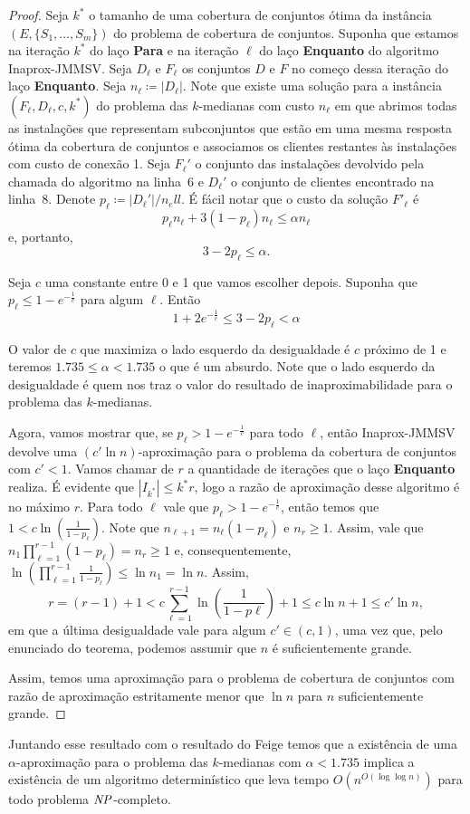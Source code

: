 \begin{proof}
Seja $k^*$ o tamanho de uma cobertura de conjuntos ótima da instância $(E,\{S_1,\ldots,S_m\})$ do problema de cobertura de conjuntos. Suponha que estamos na iteração $k^*$ do laço {\bf Para} e na iteração $\ell$ do laço {\bf Enquanto} do algoritmo {\sc Inaprox-JMMSV}.
Seja $D_\ell$ e $F_\ell$ os conjuntos $D$ e $F$ no começo dessa iteração do laço {\bf Enquanto}. Seja $n_\ell \coloneqq |D_\ell|$. Note que existe uma solução para a instância $(F_\ell,D_\ell,c,k^*)$ do problema das $k$-medianas com custo $n_\ell$ em que abrimos todas as instalações que representam subconjuntos que estão em uma mesma resposta ótima da cobertura de conjuntos e associamos os clientes restantes às instalações com custo de conexão 1.
Seja $F_\ell'$ o conjunto das instalações devolvido pela chamada do algoritmo na linha~6 e $D_\ell'$ o conjunto de clientes encontrado na linha~8. Denote $p_\ell \coloneqq  |D_\ell'|/n_ell$. É fácil notar que o custo da solução $F'_\ell$ é
\[ p_\ell n_\ell + 3 (1-p_\ell) n_\ell \leq \alpha  n_\ell\]
e, portanto, 
\[
3 - 2p_\ell \leq \alpha.
\]

Seja $c$ uma constante entre 0 e 1 que vamos escolher depois. Suponha que ${p_\ell \leq 1 - e^{-\frac{1}{c}}}$ para algum $\ell$. 
Então
\[ 1 + 2e^{-\frac{1}{c}} \leq 3 - 2p_\ell < \alpha\]

O valor de $c$ que maximiza o lado esquerdo da desigualdade é $c$ próximo de 1 e teremos $1.735 \leq \alpha < 1.735$ o que é um absurdo. Note que o lado esquerdo da desigualdade é quem nos traz o valor do resultado de inaproximabilidade para o problema das $k$-medianas.

Agora, vamos mostrar que, se $p_\ell > 1 - e^{ - \frac{1}{c}}$ para todo $\ell$, então {\sc Inaprox-JMMSV} devolve uma $(c'\ln n)$-aproximação para o problema da cobertura de conjuntos com $c' < 1$. Vamos chamar de $r$ a quantidade de iterações que o laço {\bf Enquanto} realiza. É evidente que $|I_{k^*}| \leq k^*r$, logo a razão de aproximação desse algoritmo é no máximo $r$. Para todo $\ell$ vale que $p_\ell > 1 - e^{ - \frac{1}{c}}$, então temos que $1 < c \ln\left( \frac{1}{1-p_\ell}\right)$. Note que $n_{\ell + 1} = n_\ell(1-p_\ell)$ e $n_r \geq 1$. Assim, vale que $n_1 \prod_{\ell =1}^{r-1} (1 - p_\ell) = n_r \geq 1$ e, consequentemente, $\ln\left(\prod_{\ell =1 }^{r-1} \frac{1}{1-p_\ell}\right) \leq \ln n_1 = \ln n$. Assim,
\[ r = (r - 1) + 1 < c\sum_{\ell = 1}^{r-1} \ln \left( \frac{1}{1-p\ell}\right) + 1 \leq c \ln n + 1 \leq c' \ln n, \]
em que a última desigualdade vale para algum $c' \in (c,1)$, uma vez que, pelo enunciado do teorema, podemos assumir que $n$ é suficientemente grande.

Assim, temos uma aproximação para o problema de cobertura de conjuntos com razão de aproximação estritamente menor que $\ln n$ para $n$ suficientemente grande.
\end{proof}

Juntando esse resultado com o resultado do Feige temos que a existência de uma $\alpha$-aproximação para o problema das $k$-medianas com $\alpha < 1.735$ implica a existência de um algoritmo determinístico que leva tempo $O(n^{O(\log \log n)})$ para todo problema $\mathit{NP}$-completo.